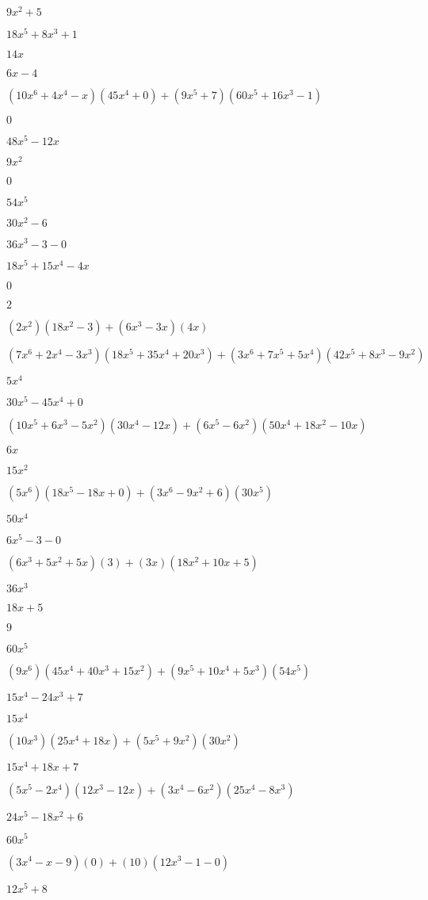 \documentclass{article}
\begin{document}
\begin{multicols}{2}
$9x^{2}+5$\item $18x^{5}+8x^{3}+1$\item $14x$\item $6x-4$\item $(10x^{6}+4x^{4}-x)(45x^{4}+0)+(9x^{5}+7)(60x^{5}+16x^{3}-1)$\item $0$\item $48x^{5}-12x$\item $9x^{2}$\item $0$\item $54x^{5}$\item $30x^{2}-6$\item $36x^{3}-3-0$\item $18x^{5}+15x^{4}-4x$\item $0$\item $2$\item $(2x^2)(18x^{2}-3)+(6x^{3}-3x)(4x)$\item $(7x^{6}+2x^{4}-3x^{3})(18x^{5}+35x^{4}+20x^{3})+(3x^{6}+7x^{5}+5x^{4})(42x^{5}+8x^{3}-9x^{2})$\item $5x^{4}$\item $30x^{5}-45x^{4}+0$\item $(10x^{5}+6x^{3}-5x^2)(30x^{4}-12x)+(6x^{5}-6x^2)(50x^{4}+18x^{2}-10x)$\item $6x$\item $15x^{2}$\item $(5x^{6})(18x^{5}-18x+0)+(3x^{6}-9x^2+6)(30x^{5})$\item $50x^{4}$\item $6x^{5}-3-0$\item $(6x^{3}+5x^2+5x)(3)+(3x)(18x^{2}+10x+5)$\item $36x^{3}$\item $18x+5$\item $9$\item $60x^{5}$\item $(9x^{6})(45x^{4}+40x^{3}+15x^{2})+(9x^{5}+10x^{4}+5x^{3})(54x^{5})$\item $15x^{4}-24x^{3}+7$\item $15x^{4}$\item $(10x^{3})(25x^{4}+18x)+(5x^{5}+9x^2)(30x^{2})$\item $15x^{4}+18x+7$\item $(5x^{5}-2x^{4})(12x^{3}-12x)+(3x^{4}-6x^2)(25x^{4}-8x^{3})$\item $24x^{5}-18x^{2}+6$\item $60x^{5}$\item $(3x^{4}-x-9)(0)+(10)(12x^{3}-1-0)$\item $12x^{5}+8$\item 
\end{multicols}
\end{document}
